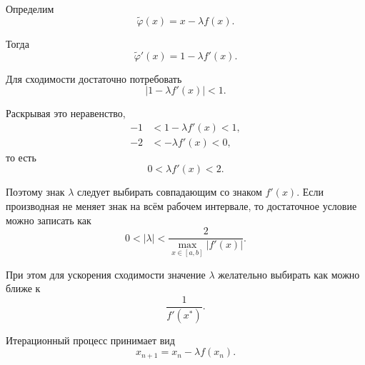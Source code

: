 \documentclass[../final.tex]{subfiles}
\begin{document}
Определим
%
\begin{equation*}
    \widetilde\varphi(x)
    =
    x-\lambda f(x).
\end{equation*}

Тогда
%
\begin{equation*}
    \widetilde\varphi'(x)
    =
    1-\lambda f'(x).
\end{equation*}

Для сходимости достаточно потребовать
%
\begin{equation*}
    |1-\lambda f'(x)|<1.
\end{equation*}

Раскрывая это неравенство,
%
\begin{align*}
    -1
    &<
    1-\lambda f'(x)
    <
    1,
    \\
    -2
    &<
    -\lambda f'(x)
    <
    0,
\end{align*}
%
то есть
%
\begin{equation*}
    0<\lambda f'(x)<2.
\end{equation*}

Поэтому знак $\lambda$ следует выбирать совпадающим со знаком
$f'(x)$. Если производная не меняет знак на всём рабочем интервале,
то достаточное условие можно записать как
%
\begin{equation*}
    0<|\lambda|
    <
    \frac{2}
    {\displaystyle\max_{x\in[a,b]}|f'(x)|}.
\end{equation*}

При этом для ускорения сходимости значение $\lambda$ желательно
выбирать как можно ближе к
%
\begin{equation*}
    \frac{1}{f'(x^*)}.
\end{equation*}

Итерационный процесс принимает вид
%
\begin{equation*}
    x_{n+1}
    =
    x_n-\lambda f(x_n).
\end{equation*}
\end{document}
